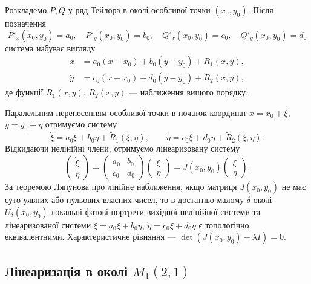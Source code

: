 \documentclass[12pt,a4paper]{article}
\begin{document}
Розкладемо $P,Q$ у ряд Тейлора в околі особливої точки $(x_0,y_0)$. Після позначення
\begin{equation*}
P'_x(x_0,y_0)=a_0,\quad P'_y(x_0,y_0)=b_0,\quad Q'_x(x_0,y_0)=c_0,\quad Q'_y(x_0,y_0)=d_0
\end{equation*}
система набуває вигляду
\begin{equation*}
\begin{aligned}
\dot{x} &= a_0(x-x_0)+b_0(y-y_0)+R_1(x,y),\\
\dot{y} &= c_0(x-x_0)+d_0(y-y_0)+R_2(x,y),
\end{aligned}
\end{equation*}
де функції $R_1(x,y)$, $R_2(x,y)$ --- наближення вищого порядку.

Паралельним перенесенням особливої точки в початок координат $x=x_0+\xi$, $y=y_0+\eta$ отримуємо систему
\begin{equation*}
\dot{\xi}=a_0\xi+b_0\eta+\tilde{R}_1(\xi,\eta),\qquad
\dot{\eta}=c_0\xi+d_0\eta+\tilde{R}_2(\xi,\eta).
\end{equation*}
Відкидаючи нелінійні члени, отримуємо лінеаризовану систему
\begin{equation*}
\begin{pmatrix}\dot{\xi}\\ \dot{\eta}\end{pmatrix}
=
\begin{pmatrix}a_0 & b_0\\ c_0 & d_0\end{pmatrix}
\begin{pmatrix}\xi\\ \eta\end{pmatrix}
= J(x_0,y_0)\begin{pmatrix}\xi\\ \eta\end{pmatrix}.
\end{equation*}
За теоремою Ляпунова про лінійне наближення, якщо матриця $J(x_0,y_0)$ не має суто уявних або нульових власних чисел, то в достатньо малому $\delta$-околі $U_\delta(x_0,y_0)$ локальні фазові портрети вихідної нелінійної системи та лінеаризованої системи
$\dot{\xi}=a_0\xi+b_0\eta$, $\dot{\eta}=c_0\xi+d_0\eta$ є топологічно еквівалентними.
Характеристичне рівняння --- $\det(J(x_0,y_0)-\lambda I)=0$.

\subsection{Лінеаризація в околі $M_1(2,1)$}\label{subsec:M1_37}
\end{document}
